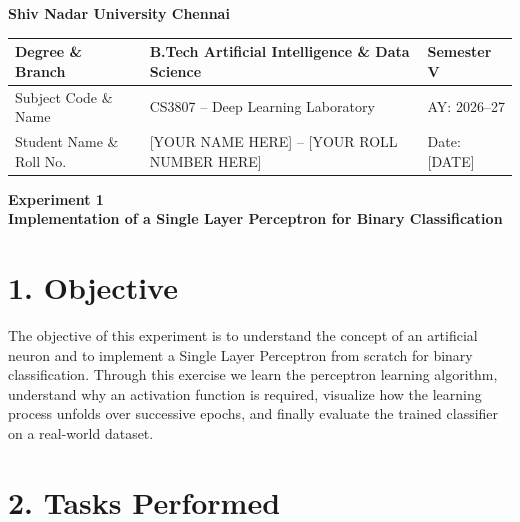 \documentclass[11pt]{article}
\begin{document}
\begin{center}
\Large\textbf{Shiv Nadar University Chennai}\\[2mm]
\end{center}

\renewcommand{\arraystretch}{1.4}

\begin{tabular}{|p{3.5cm}|p{8cm}|p{2cm}|}
\hline
Degree \& Branch & B.Tech Artificial Intelligence \& Data Science & Semester V\\ \hline
Subject Code \& Name & CS3807 -- Deep Learning Laboratory & AY: 2026--27\\ \hline
Student Name \& Roll No. & [YOUR NAME HERE] -- [YOUR ROLL NUMBER HERE] & Date: [DATE]\\ \hline
\end{tabular}

\vspace{3mm}

\begin{center}
\Large\textbf{Experiment 1}\\
\large\textbf{Implementation of a Single Layer Perceptron for Binary Classification}
\end{center}

\section*{1. Objective}

The objective of this experiment is to understand the concept of an artificial neuron and to implement a Single Layer Perceptron from scratch for binary classification. Through this exercise we learn the perceptron learning algorithm, understand why an activation function is required, visualize how the learning process unfolds over successive epochs, and finally evaluate the trained classifier on a real-world dataset.

\section*{2. Tasks Performed}
\end{document}

